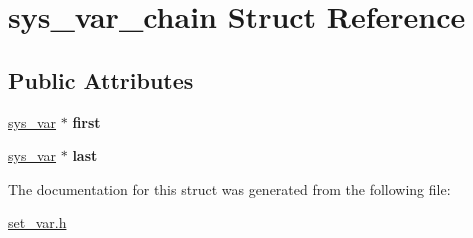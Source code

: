 \hypertarget{structsys__var__chain}{}\section{sys\+\_\+var\+\_\+chain Struct Reference}
\label{structsys__var__chain}
\subsection*{Public Attributes}
\begin{DoxyCompactItemize}
\item 
\mbox{\label{structsys__var__chain_a36e6869dc920f7acba902e1caed9bd2f}} 
\mbox{\hyperlink{classsys__var}{sys\+\_\+var}} $\ast$ {\bfseries first}
\item 
\mbox{\label{structsys__var__chain_a8d9efdff0b9911774b6253d78b792bc6}} 
\mbox{\hyperlink{classsys__var}{sys\+\_\+var}} $\ast$ {\bfseries last}
\end{DoxyCompactItemize}


The documentation for this struct was generated from the following file\+:\begin{DoxyCompactItemize}
\item 
\mbox{\hyperlink{set__var_8h}{set\+\_\+var.\+h}}\end{DoxyCompactItemize}
